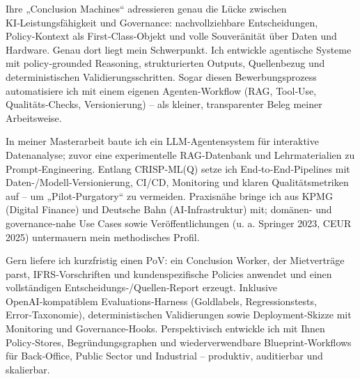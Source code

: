 Ihre „Conclusion Machines“ adressieren genau die Lücke zwischen KI‑Leistungsfähigkeit und Governance: nachvollziehbare Entscheidungen, Policy‑Kontext als First‑Class‑Objekt und volle Souveränität über Daten und Hardware. Genau dort liegt mein Schwerpunkt. Ich entwickle agentische Systeme mit policy‑grounded Reasoning, strukturierten Outputs, Quellenbezug und deterministischen Validierungsschritten. Sogar diesen Bewerbungsprozess automatisiere ich mit einem eigenen Agenten‑Workflow (RAG, Tool‑Use, Qualitäts‑Checks, Versionierung) – als kleiner, transparenter Beleg meiner Arbeitsweise.

In meiner Masterarbeit baute ich ein LLM‑Agentensystem für interaktive Datenanalyse; zuvor eine experimentelle RAG‑Datenbank und Lehrmaterialien zu Prompt‑Engineering. Entlang CRISP‑ML(Q) setze ich End‑to‑End‑Pipelines mit Daten-/Modell‑Versionierung, CI/CD, Monitoring und klaren Qualitätsmetriken auf – um „Pilot‑Purgatory“ zu vermeiden. Praxisnähe bringe ich aus KPMG (Digital Finance) und Deutsche Bahn (AI‑Infrastruktur) mit; domänen- und governance‑nahe Use Cases sowie Veröffentlichungen (u. a. Springer 2023, CEUR 2025) untermauern mein methodisches Profil.

Gern liefere ich kurzfristig einen PoV: ein Conclusion Worker, der Mietverträge parst, IFRS‑Vorschriften und kundenspezifische Policies anwendet und einen vollständigen Entscheidungs‑/Quellen‑Report erzeugt. Inklusive OpenAI‑kompatiblem Evaluations‑Harness (Goldlabels, Regressionstests, Error‑Taxonomie), deterministischen Validierungen sowie Deployment‑Skizze mit Monitoring und Governance‑Hooks. Perspektivisch entwickle ich mit Ihnen Policy‑Stores, Begründungsgraphen und wiederverwendbare Blueprint‑Workflows für Back‑Office, Public Sector und Industrial – produktiv, auditierbar und skalierbar.